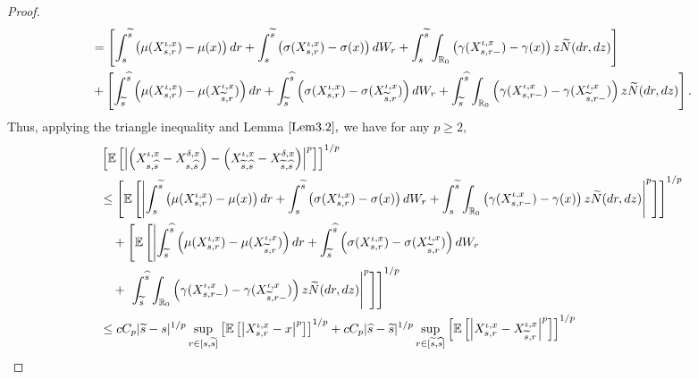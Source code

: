 \documentclass[11pt]{article}
\theoremstyle{theorem}
\theoremstyle{definition}
\newcommand{\bR}{\mathbb{R}}
\newcommand{\1}{{\bf 1}}
\begin{document}
\begin{proof}
\begin{align*}
  & =  \left[\int_s^{\widetilde{s}}  \left(\mu(X_{s, r}^{\iota, x})-\mu(x)\right) dr + \int_s^{\widetilde{s}} \left(\sigma(X_{s, r}^{\iota, x}) -\sigma(x)\right) dW_r+ \int_s^{\widetilde{s}} \int_{\bR_0} \left(\gamma (X_{s, r-}^{\iota, x})-\gamma(x)\right) z \widetilde{N}(dr, dz) \right] \notag \\
   &  + \left[\int_{\widetilde{s}}^{\widehat{s}} \left( \mu(X_{s, r}^{\iota, x})-\mu(X_{\widetilde{s}, r}^{\iota, x}) \right) dr + \int_{\widetilde{s}}^{\widehat{s}} \left(\sigma(X_{s, r}^{\iota, x}) -\sigma(X_{\widetilde{s}, r}^{\iota, x}) \right) dW_r+ \int_{\widetilde{s}}^{\widehat{s}} \int_{\bR_0} \left(\gamma (X_{s, r-}^{\iota, x})-\gamma (X_{\widetilde{s}, r-}^{\iota, x})\right) z \widetilde{N}(dr, dz) \right]. 
\end{align*}
Thus, applying the triangle inequality and Lemma $\ref{Lem3.2},$ we have for any $p \ge 2,$
\begin{align*}
&\left[\mathbb{E}\left[\left|\left(X^{\iota, x}_{s,\widehat{s}}-X^{\delta,x}_{s,\widehat{s}}\right) - \left(X^{\iota, x}_{\widetilde{s},\widehat{s}}-X^{\delta, x}_{\widetilde{s},\widehat{s}}\right)\right|^p\right]\right]^{1/p} \notag\\ 
  & \le  \left[\mathbb{E}\left[\left|\int_s^{\widetilde{s}}  \left(\mu(X_{s, r}^{\iota, x})-\mu(x)\right) dr + \int_s^{\widetilde{s}} \left(\sigma(X_{s, r}^{\iota, x}) -\sigma(x)\right) dW_r+ \int_s^{\widetilde{s}} \int_{\bR_0} \left(\gamma (X_{s, r-}^{\iota, x})-\gamma(x)\right) z \widetilde{N}(dr, dz) \right|^p\right]\right]^{1/p} \notag \\
   & \quad + \left[\mathbb{E}\left[\left| \int_{\widetilde{s}}^{\widehat{s}} \left( \mu(X_{s, r}^{\iota, x})-\mu(X_{\widetilde{s}, r}^{\iota, x}) \right) dr + \int_{\widetilde{s}}^{\widehat{s}} \left(\sigma(X_{s, r}^{\iota, x}) -\sigma(X_{\widetilde{s}, r}^{\iota, x}) \right) dW_r \right. \right. \right. \notag \\
   & \quad + \left. \left. \left. \int_{\widetilde{s}}^{\widehat{s}} \int_{\bR_0} \left(\gamma (X_{s, r-}^{\iota, x})-\gamma (X_{\widetilde{s}, r-}^{\iota, x})\right) z \widetilde{N}(dr, dz) \right|^p\right]\right]^{1/p} 
 \notag \\
 & \leq c C_p |\widetilde{s}-s|^{1/p} \sup_{r\in [s, \widetilde{s}]} \left[ \mathbb{E} \left[\left| X^{\iota,x}_{s, r}-x \right|^p \right]\right]^{1/p} + c C_p |\widehat{s}-\widetilde{s}|^{1/p} \sup_{r\in [ \widetilde{s}, \widehat{s}]} \left[ \mathbb{E} \left[\left| X^{\iota,x}_{s, r}-X^{\iota,x}_{\widetilde{s}, r} \right|^p \right]\right]^{1/p}  \notag\\

\end{align*}
\end{proof}
\end{document}
